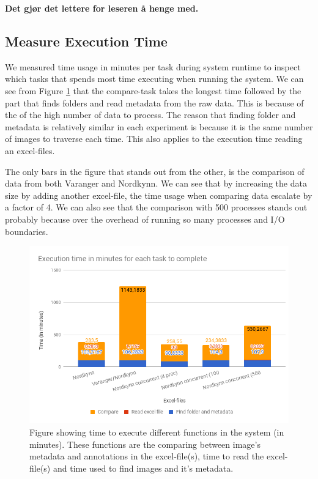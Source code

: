 \documentclass[USenglish]{uit-thesis}
\begin{document}
\textbf{Det gjør det lettere for leseren å henge med.}
\fi

\subsection{Measure Execution Time} \label{sec:eva_time}

We measured time usage in minutes per task during system runtime to inspect which tasks that spends most time executing when running the system. We can see from Figure \ref{fig:time_chart500} that the compare-task takes the longest time followed by the part that finds folders and read metadata from the raw data. This is because of the of the high number of data to process. The reason that finding folder and metadata is relatively similar in each experiment is because it is the same number of images to traverse each time. This also applies to the execution time reading an excel-files.

The only bars in the figure that stands out from the other, is the comparison of data from both Varanger and Nordkynn. We can see that by increasing the data size by adding another excel-file, the time usage when comparing data escalate by a factor of 4. We can also see that the comparison with 500 processes stands out probably because over the overhead of running so many processes and I/O boundaries.


\begin{figure} %
\centering
\includegraphics[width=\textwidth]{chart_done.png}
\caption{Figure showing time to execute different functions in the system (in minutes). These functions are the comparing between image's metadata and annotations in the excel-file(s), time to read the excel-file(s) and time used to find images and it's metadata.}
\label{fig:time_chart500}
\end{figure}
\end{document}
